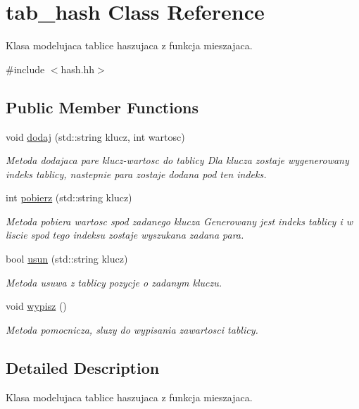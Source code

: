 \hypertarget{classtab__hash}{\section{tab\-\_\-hash Class Reference}
\label{classtab__hash}
}


Klasa modelujaca tablice haszujaca z funkcja mieszajaca.  




{\ttfamily \#include $<$hash.\-hh$>$}

\subsection*{Public Member Functions}
\begin{DoxyCompactItemize}
\item 
void \hyperlink{classtab__hash_a39f76bff6274835740800f4928e74572}{dodaj} (std\-::string klucz, int wartosc)
\begin{DoxyCompactList}\small\item\em Metoda dodajaca pare klucz-\/wartosc do tablicy Dla klucza zostaje wygenerowany indeks tablicy, nastepnie para zostaje dodana pod ten indeks. \end{DoxyCompactList}\item 
int \hyperlink{classtab__hash_a6aa6a2f8584e197779438c7efc74670e}{pobierz} (std\-::string klucz)
\begin{DoxyCompactList}\small\item\em Metoda pobiera wartosc spod zadanego klucza Generowany jest indeks tablicy i w liscie spod tego indeksu zostaje wyszukana zadana para. \end{DoxyCompactList}\item 
bool \hyperlink{classtab__hash_a73d7a7a29585857af57cba5553f1fbdb}{usun} (std\-::string klucz)
\begin{DoxyCompactList}\small\item\em Metoda usuwa z tablicy pozycje o zadanym kluczu. \end{DoxyCompactList}\item 
void \hyperlink{classtab__hash_a3df24b45142c2fb0955cd396b5c5f166}{wypisz} ()
\begin{DoxyCompactList}\small\item\em Metoda pomocnicza, sluzy do wypisania zawartosci tablicy. \end{DoxyCompactList}\end{DoxyCompactItemize}


\subsection{Detailed Description}
Klasa modelujaca tablice haszujaca z funkcja mieszajaca. 

